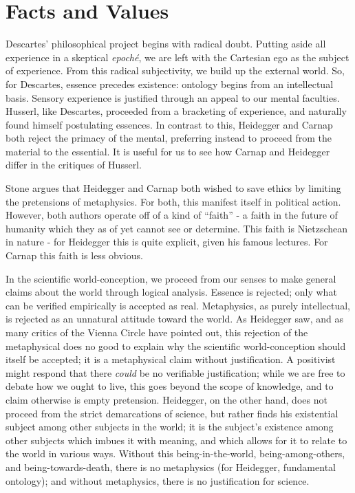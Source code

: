 \documentclass[leqno, 12pt]{turabian-researchpaper}
\begin{document}
	\section{Facts and Values}

	Descartes' philosophical project begins with radical doubt. Putting aside all
	experience in a skeptical \textit{epoch\'e}, we are left with the Cartesian
	ego as the subject of experience. From this radical subjectivity, we build up
	the external world. So, for Descartes, essence precedes existence: ontology
	begins from an intellectual basis. Sensory experience is justified through an appeal
	to our mental faculties. Husserl, like Descartes, proceeded from a bracketing
	of experience, and naturally found himself postulating essences. In contrast
	to this, Heidegger and Carnap both reject the primacy of the mental,
	preferring instead to proceed from the material to the essential. It is useful
	for us to see how Carnap and Heidegger differ in the critiques of Husserl.

	Stone argues that Heidegger and Carnap both wished to save ethics by limiting the
	pretensions of metaphysics. For both, this manifest itself in political action.
	However, both authors operate off of a kind of \enquote{faith} - a faith in
	the future of humanity which they as of yet cannot see or determine. This faith
	is Nietzschean in nature - for Heidegger this is quite explicit, given his
	famous lectures. For Carnap this faith is less obvious. \autocite{sachs2011a}

	In the scientific world-conception, we proceed from our senses to make general
	claims about the world through logical analysis. Essence is rejected; only what
	can be verified empirically is accepted as real. Metaphysics, as purely intellectual,
	is rejected as an unnatural attitude toward the world. As Heidegger saw, and
	as many critics of the Vienna Circle have pointed out, this rejection of the metaphysical
	does no good to explain why the scientific world-conception should itself be accepted;
	it is a metaphysical claim without justification. A positivist might respond that
	there \emph{could} be no verifiable justification; while we are free to debate
	how we ought to live, this goes beyond the scope of knowledge, and to claim otherwise
	is empty pretension. Heidegger, on the other hand, does not proceed from the
	strict demarcations of science, but rather finds his existential subject among
	other subjects in the world; it is the subject's existence among other
	subjects which imbues it with meaning, and which allows for it to relate to the
	world in various ways. Without this being-in-the-world, being-among-others,
	and being-towards-death, there is no metaphysics (for Heidegger, fundamental ontology);
	and without metaphysics, there is no justification for science.
\end{document}
